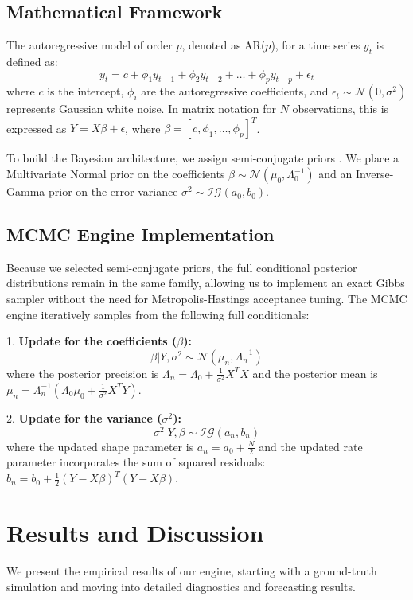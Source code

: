 \documentclass{article}
\begin{document}
\subsection{Mathematical Framework}
The autoregressive model of order $p$, denoted as AR($p$), for a time series $y_t$ is defined as:
$$y_t = c + \phi_1 y_{t-1} + \phi_2 y_{t-2} + \dots + \phi_p y_{t-p} + \epsilon_t$$
where $c$ is the intercept, $\phi_i$ are the autoregressive coefficients, and $\epsilon_t \sim \mathcal{N}(0, \sigma^2)$ represents Gaussian white noise. In matrix notation for $N$ observations, this is expressed as $Y = X\beta + \epsilon$, where $\beta = [c, \phi_1, \dots, \phi_p]^T$.

To build the Bayesian architecture, we assign semi-conjugate priors \cite{gelman2013bayesian}. We place a Multivariate Normal prior on the coefficients $\beta \sim \mathcal{N}(\mu_0, \Lambda_0^{-1})$ and an Inverse-Gamma prior on the error variance $\sigma^2 \sim \mathcal{IG}(a_0, b_0)$.

\subsection{MCMC Engine Implementation}
Because we selected semi-conjugate priors, the full conditional posterior distributions remain in the same family, allowing us to implement an exact Gibbs sampler \cite{robert2010monte} without the need for Metropolis-Hastings acceptance tuning. The MCMC engine iteratively samples from the following full conditionals:

1. \textbf{Update for the coefficients ($\beta$):}
$$\beta | Y, \sigma^2 \sim \mathcal{N}(\mu_n, \Lambda_n^{-1})$$
where the posterior precision is $\Lambda_n = \Lambda_0 + \frac{1}{\sigma^2} X^T X$ and the posterior mean is $\mu_n = \Lambda_n^{-1} (\Lambda_0 \mu_0 + \frac{1}{\sigma^2} X^T Y)$.

2. \textbf{Update for the variance ($\sigma^2$):}
$$\sigma^2 | Y, \beta \sim \mathcal{IG}(a_n, b_n)$$
where the updated shape parameter is $a_n = a_0 + \frac{N}{2}$ and the updated rate parameter incorporates the sum of squared residuals: $b_n = b_0 + \frac{1}{2} (Y - X\beta)^T(Y - X\beta)$.

\section{Results and Discussion}
We present the empirical results of our engine, starting with a ground-truth simulation and moving into detailed diagnostics and forecasting results.
\end{document}
